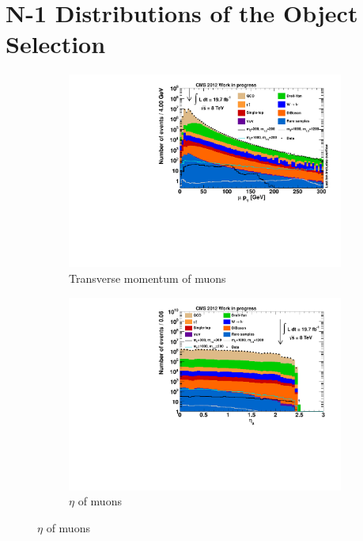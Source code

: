 \chapter{N-1 Distributions of the Object Selection }
\label{cha:n-1app}

\begin{figure}[!htbp]
  \centering
  \begin{subfigure}[b]{0.495\textwidth}
    \centering
    \includegraphics[width=\textwidth]{plots/nMuon_pt.pdf}
    \caption{Transverse momentum of muons\label{fig:muo_pt}}
  \end{subfigure}
  \begin{subfigure}[b]{0.495\textwidth}
    \centering
    \includegraphics[width=\textwidth]{plots/nMuon_eta.pdf}
    \caption{$\eta$ of muons\label{fig:muo_eta}}
  \end{subfigure}
\end{figure}


